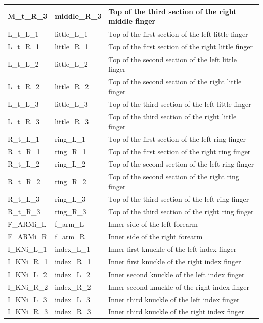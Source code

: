 \documentclass[../main.tex]{subfiles}
\begin{document}
\begin{longtable}{|p{2cm}|p{3cm}|p{5cm}|}
    M\_t\_R\_3 & middle\_R\_3 & Top of the third section of the right middle finger \\ \hline
    L\_t\_L\_1 & little\_L\_1 & Top of the first section of the left little finger \\ \hline
    L\_t\_R\_1 & little\_R\_1 & Top of the first section of the right little finger \\ \hline
    L\_t\_L\_2 & little\_L\_2 & Top of the second section of the left little finger \\ \hline
    L\_t\_R\_2 & little\_R\_2 & Top of the second section of the right little finger \\ \hline
    L\_t\_L\_3 & little\_L\_3 & Top of the third section of the left little finger \\ \hline
    L\_t\_R\_3 & little\_R\_3 & Top of the third section of the right little finger \\ \hline
    R\_t\_L\_1 & ring\_L\_1 & Top of the first section of the left ring finger \\ \hline
    R\_t\_R\_1 & ring\_R\_1 & Top of the first section of the right ring finger \\ \hline
    R\_t\_L\_2 & ring\_L\_2 & Top of the second section of the left ring finger \\ \hline
    R\_t\_R\_2 & ring\_R\_2 & Top of the second section of the right ring finger \\ \hline
    R\_t\_L\_3 & ring\_L\_3 & Top of the third section of the left ring finger \\ \hline
    R\_t\_R\_3 & ring\_R\_3 & Top of the third section of the right ring finger \\ \hline
    F\_ARMi\_L & f\_arm\_L & Inner side of the left forearm \\ \hline
    F\_ARMi\_R & f\_arm\_R & Inner side of the right forearm \\ \hline
    I\_KNi\_L\_1 & index\_L\_1 & Inner first knuckle of the left index finger \\ \hline
    I\_KNi\_R\_1 & index\_R\_1 & Inner first knuckle of the right index finger \\ \hline
    I\_KNi\_L\_2 & index\_L\_2 & Inner second knuckle of the left index finger \\ \hline
    I\_KNi\_R\_2 & index\_R\_2 & Inner second knuckle of the right index finger \\ \hline
    I\_KNi\_L\_3 & index\_L\_3 & Inner third knuckle of the left index finger \\ \hline
    I\_KNi\_R\_3 & index\_R\_3 & Inner third knuckle of the right index finger \\ \hline

\end{longtable}
\end{document}
